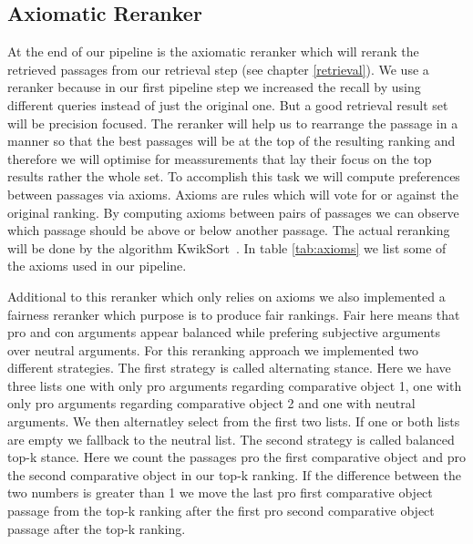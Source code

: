     \subsection{Axiomatic Reranker}
        At the end of our pipeline is the axiomatic reranker which will rerank the retrieved passages from our retrieval step (see chapter \ref{retrieval}). We use a reranker because in our first pipeline step we increased the recall by using different queries instead of just the original one. But a good retrieval result set will be precision focused. The reranker will help us to rearrange the passage in a manner so that the best passages will be at the top of the resulting ranking and therefore we will optimise for meassurements that lay their focus on the top results rather the whole set. To accomplish this task we will compute preferences between passages via axioms. Axioms are rules which will vote for or against the original ranking. By computing axioms between pairs of passages we can observe which passage should be above or below another passage. The actual reranking will be done by the algorithm KwikSort~\cite{hagen:2016d}. In table \ref{tab:axioms} we list some of the axioms used in our pipeline.\par
        Additional to this reranker which only relies on axioms we also implemented a fairness reranker which purpose is to produce fair rankings. Fair here means that pro and con arguments appear balanced while prefering subjective arguments over neutral arguments. For this reranking approach we implemented two different strategies. The first strategy is called alternating stance. Here we have three lists one with only pro arguments regarding comparative object 1, one  with only pro arguments regarding comparative object 2 and one with neutral arguments. We then alternatley select from the first two lists. If one or both lists are empty we fallback to the neutral list. The second strategy is called balanced top-k stance. Here we count the passages pro the first comparative object and pro the second comparative object in our top-k ranking. If the difference between the two numbers is greater than 1 we move the last pro first comparative object passage from the top-k ranking after the first pro second comparative object passage after the top-k ranking.     

